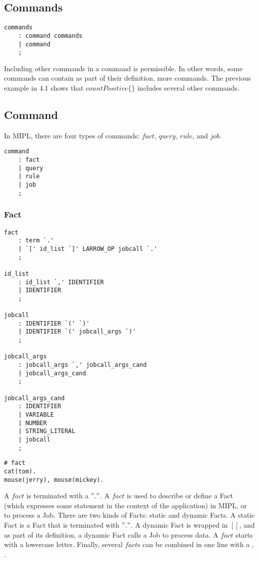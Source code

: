 \documentclass[prodmode,acmtecs]{acmsmall}
\begin{document}
\subsection{Commands}

\begin{lstlisting}
commands
	: command commands
	| command
	;
\end{lstlisting}

Including other commands in a command is permissible. In other words, some commands
 can contain as part of their definition, more commands. The previous example in 4.1
 shows that $countPositive\{\}$ includes several other commands. 
\medskip

\subsection{Command}

In MIPL, there are four types of commands: $fact$, $query$, $rule$, and $job$.

\begin{lstlisting}
command
	: fact
	| query
	| rule
	| job
	;
\end{lstlisting}
\medskip


\subsubsection{Fact}
\begin{lstlisting}
fact
	: term `.'			
	| `[' id_list `]' LARROW_OP jobcall `.'
	;

id_list
	: id_list `,' IDENTIFIER
	| IDENTIFIER		
	;

jobcall
	: IDENTIFIER `(' `)'
	| IDENTIFIER `(' jobcall_args `)'
	;

jobcall_args
	: jobcall_args `,' jobcall_args_cand
	| jobcall_args_cand
	;

jobcall_args_cand
	: IDENTIFIER
	| VARIABLE
	| NUMBER
	| STRING_LITERAL
	| jobcall
	;
\end{lstlisting}

\begin{lstlisting}
# fact
cat(tom).
mouse(jerry), mouse(mickey).
\end{lstlisting}

A $fact$ is terminated with a $"."$. A $fact$ is used to describe or define a Fact (which 
 expresses some statement in the context of the application) in MIPL, or to
 process a Job. There are two kinds of Facts: static and dynamic Facts. A static Fact 
 is a Fact that is terminated with $"."$. A dynamic Fact is wrapped in $[ ]$, 
 and as part of its definition, a dynamic Fact calls a Job to process data. A $fact$
 starts with a lowercase letter. Finally, several $fact$s can be combined
 in one line with a $,$.
\medskip
\end{document}

